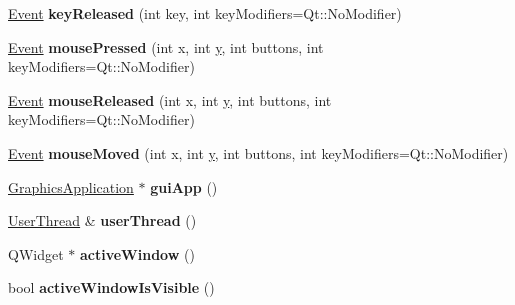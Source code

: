 \begin{DoxyCompactItemize}
\item 
\hypertarget{group___event_ga91a2c851964a7afc41c3ae873abcee5d}{\hyperlink{struct_d_o_1_1_event}{Event} {\bfseries key\-Released} (int key, int key\-Modifiers=Qt\-::\-No\-Modifier)}\label{group___event_ga91a2c851964a7afc41c3ae873abcee5d}

\item 
\hypertarget{group___event_ga9b9ff63b87aedb4d5141fed7365c911b}{\hyperlink{struct_d_o_1_1_event}{Event} {\bfseries mouse\-Pressed} (int x, int \hyperlink{group___channel_accessors_gac90c52c5b3a7b2a7e3761e6e84f25778}{y}, int buttons, int key\-Modifiers=Qt\-::\-No\-Modifier)}\label{group___event_ga9b9ff63b87aedb4d5141fed7365c911b}

\item 
\hypertarget{group___event_ga506192889c6399011033aa9e8b2e1a49}{\hyperlink{struct_d_o_1_1_event}{Event} {\bfseries mouse\-Released} (int x, int \hyperlink{group___channel_accessors_gac90c52c5b3a7b2a7e3761e6e84f25778}{y}, int buttons, int key\-Modifiers=Qt\-::\-No\-Modifier)}\label{group___event_ga506192889c6399011033aa9e8b2e1a49}

\item 
\hypertarget{group___event_gaafd1ef3bc6a9ecb40de90ca46a8fc852}{\hyperlink{struct_d_o_1_1_event}{Event} {\bfseries mouse\-Moved} (int x, int \hyperlink{group___channel_accessors_gac90c52c5b3a7b2a7e3761e6e84f25778}{y}, int buttons, int key\-Modifiers=Qt\-::\-No\-Modifier)}\label{group___event_gaafd1ef3bc6a9ecb40de90ca46a8fc852}

\item 
\hypertarget{group___graphics_internal_ga337b7855de20a6d29b8f511a12fe5203}{\hyperlink{class_d_o_1_1_graphics_application}{Graphics\-Application} $\ast$ {\bfseries gui\-App} ()}\label{group___graphics_internal_ga337b7855de20a6d29b8f511a12fe5203}

\item 
\hypertarget{group___graphics_internal_gae68dd6e7617aa9e913b119b4d9931e56}{\hyperlink{class_d_o_1_1_user_thread}{User\-Thread} \& {\bfseries user\-Thread} ()}\label{group___graphics_internal_gae68dd6e7617aa9e913b119b4d9931e56}

\item 
\hypertarget{group___graphics_internal_ga932aea9cacdda38e1038be9193f13003}{Q\-Widget $\ast$ {\bfseries active\-Window} ()}\label{group___graphics_internal_ga932aea9cacdda38e1038be9193f13003}

\item 
\hypertarget{group___graphics_internal_gaffca2d4c12a458a3de219b805b1741d3}{bool {\bfseries active\-Window\-Is\-Visible} ()}\label{group___graphics_internal_gaffca2d4c12a458a3de219b805b1741d3}


\end{DoxyCompactItemize}
